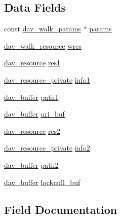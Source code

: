 \subsection*{Data Fields}
\begin{DoxyCompactItemize}
\item 
const \hyperlink{structdav__walk__params}{dav\+\_\+walk\+\_\+params} $\ast$ \hyperlink{structdav__fs__walker__context_a2e623a2be93274e5f92b6ae6bb57acaa}{params}
\item 
\hyperlink{structdav__walk__resource}{dav\+\_\+walk\+\_\+resource} \hyperlink{structdav__fs__walker__context_a3b61c3a87ff7b3d88e985851d71cf963}{wres}
\item 
\hyperlink{structdav__resource}{dav\+\_\+resource} \hyperlink{structdav__fs__walker__context_a007a471962e07ab6f493863426fd2542}{res1}
\item 
\hyperlink{structdav__resource__private}{dav\+\_\+resource\+\_\+private} \hyperlink{structdav__fs__walker__context_ab906dd71ba269551ed4c0e4cb5fa6bd2}{info1}
\item 
\hyperlink{structdav__buffer}{dav\+\_\+buffer} \hyperlink{structdav__fs__walker__context_a7ae29659b0de757baf93609fdb2427a5}{path1}
\item 
\hyperlink{structdav__buffer}{dav\+\_\+buffer} \hyperlink{structdav__fs__walker__context_a43f153ce977e7131c75be802d9f7e9f9}{uri\+\_\+buf}
\item 
\hyperlink{structdav__resource}{dav\+\_\+resource} \hyperlink{structdav__fs__walker__context_af564696067cc25c81dad30b53ad81d26}{res2}
\item 
\hyperlink{structdav__resource__private}{dav\+\_\+resource\+\_\+private} \hyperlink{structdav__fs__walker__context_a2d15006ec983587d1725d16ede8c78de}{info2}
\item 
\hyperlink{structdav__buffer}{dav\+\_\+buffer} \hyperlink{structdav__fs__walker__context_aa7411ddad65601efe5a275cc5cf6a57c}{path2}
\item 
\hyperlink{structdav__buffer}{dav\+\_\+buffer} \hyperlink{structdav__fs__walker__context_ac0d1f5ef568f22d792761b1b90c10f46}{locknull\+\_\+buf}
\end{DoxyCompactItemize}


\subsection{Field Documentation}
